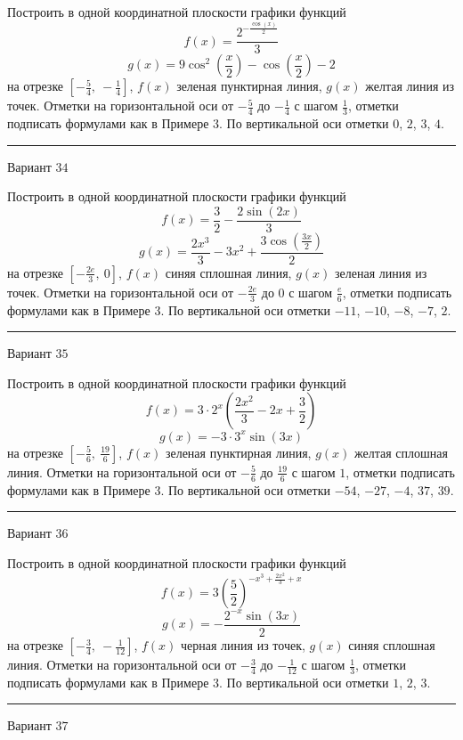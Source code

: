 \documentclass[11pt]{report}
\begin{document}
Построить в одной координатной плоскости графики функций $$f(x) = \frac{2^{- \frac{\cos{\left(x \right)}}{2}}}{3}$$ $$g(x) = 9 \cos^{2}{\left(\frac{x}{2} \right)} - \cos{\left(\frac{x}{2} \right)} - 2$$ на отрезке $\left[- \frac{5}{4}, \  - \frac{1}{4}\right]$, $f(x)$ зеленая пунктирная линия, $g(x)$ желтая линия из точек. Отметки на горизонтальной оси от $- \frac{5}{4}$ до $- \frac{1}{4}$ с шагом $\frac{1}{3}$, отметки подписать формулами как в Примере 3. По вертикальной оси отметки $0$, $2$, $3$, $4$.
\begin{center}
\noindent\rule{8cm}{0.4pt}
\end{center}
Вариант $34$


Построить в одной координатной плоскости графики функций $$f(x) = \frac{3}{2} - \frac{2 \sin{\left(2 x \right)}}{3}$$ $$g(x) = \frac{2 x^{3}}{3} - 3 x^{2} + \frac{3 \cos{\left(\frac{3 x}{2} \right)}}{2}$$ на отрезке $\left[- \frac{2 e}{3}, \  0\right]$, $f(x)$ синяя сплошная линия, $g(x)$ зеленая линия из точек. Отметки на горизонтальной оси от $- \frac{2 e}{3}$ до $0$ с шагом $\frac{e}{6}$, отметки подписать формулами как в Примере 3. По вертикальной оси отметки $-11$, $-10$, $-8$, $-7$, $2$.
\begin{center}
\noindent\rule{8cm}{0.4pt}
\end{center}
Вариант $35$


Построить в одной координатной плоскости графики функций $$f(x) = 3 \cdot 2^{x} \left(\frac{2 x^{2}}{3} - 2 x + \frac{3}{2}\right)$$ $$g(x) = - 3 \cdot 3^{x} \sin{\left(3 x \right)}$$ на отрезке $\left[- \frac{5}{6}, \  \frac{19}{6}\right]$, $f(x)$ зеленая пунктирная линия, $g(x)$ желтая сплошная линия. Отметки на горизонтальной оси от $- \frac{5}{6}$ до $\frac{19}{6}$ с шагом $1$, отметки подписать формулами как в Примере 3. По вертикальной оси отметки $-54$, $-27$, $-4$, $37$, $39$.
\begin{center}
\noindent\rule{8cm}{0.4pt}
\end{center}
Вариант $36$


Построить в одной координатной плоскости графики функций $$f(x) = 3 \left(\frac{5}{2}\right)^{- x^{3} + \frac{2 x^{2}}{3} + x}$$ $$g(x) = - \frac{2^{- x} \sin{\left(3 x \right)}}{2}$$ на отрезке $\left[- \frac{3}{4}, \  - \frac{1}{12}\right]$, $f(x)$ черная линия из точек, $g(x)$ синяя сплошная линия. Отметки на горизонтальной оси от $- \frac{3}{4}$ до $- \frac{1}{12}$ с шагом $\frac{1}{3}$, отметки подписать формулами как в Примере 3. По вертикальной оси отметки $1$, $2$, $3$.
\begin{center}
\noindent\rule{8cm}{0.4pt}
\end{center}
Вариант $37$
\end{document}
